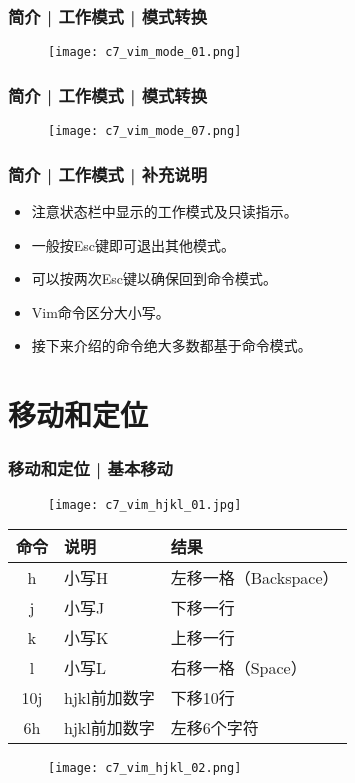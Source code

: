 \begin{frame}
  \frametitle{简介 | 工作模式 | \alert{模式转换}}
  \begin{figure}
    \centering
    \texttt{[image: c7\_vim\_mode\_01.png]}
  \end{figure}
\end{frame}

\begin{frame}
  \frametitle{简介 | 工作模式 | 模式转换}
  \begin{figure}
    \centering
    \texttt{[image: c7\_vim\_mode\_07.png]}
  \end{figure}
\end{frame}

\begin{frame}
  \frametitle{简介 | 工作模式 | 补充说明}
  \begin{itemize}[<+->]
    \item 注意状态栏中显示的工作模式及只读指示。
    \item 一般按Esc键即可退出其他模式。
    \item 可以按两次Esc键以确保回到命令模式。
    \item Vim命令区分大小写。
    \item 接下来介绍的命令绝大多数都基于命令模式。
  \end{itemize}
\end{frame}

\section{移动和定位}
\begin{frame}
  \frametitle{移动和定位 | \alert{基本移动}}
  \begin{figure}
    \centering
    \texttt{[image: c7\_vim\_hjkl\_01.jpg]}
  \end{figure}
  \begin{table}
    \centering
    \begin{tabularx}{0.8\textwidth}{cXX}
      \hline
      \rowcolor{blue!50}命令 & 说明 & 结果\\
      \hline
      h & 小写H & 左移一格（Backspace）\\
      j & 小写J & 下移一行\\
      k & 小写K & 上移一行\\
      l & 小写L & 右移一格（Space）\\
      10j & hjkl前加数字 & 下移10行\\
      6h & hjkl前加数字 & 左移6个字符\\
      \hline
    \end{tabularx}
  \end{table}
  \begin{figure}
    \centering
    \texttt{[image: c7\_vim\_hjkl\_02.png]}
  \end{figure}
\end{frame}

